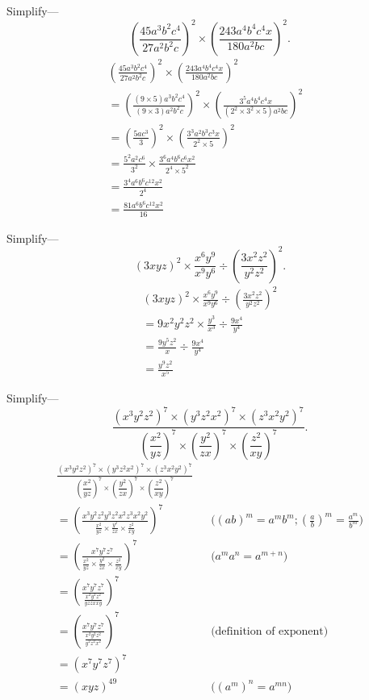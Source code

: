 \documentclass[DIN, pagenumber=false, fontsize=11pt, parskip=half]{scrartcl}
\begin{document}
\begin{problems}[from=1,step=1]
    \problem Simplify---
    \[
        \left(\frac{45 a^3 b^2 c^4}{27 a^2 b^2 c}\right)^{2} \times \left(\frac{243 a^4 b^4 c^4 x}{180 a^2 b c}\right)^{2}.
    \]
    \answer 
    \begin{align*}
        \left(\frac{45a^3b^2c^4}{27a^2b^2c}\right)^2 \times \left(\frac{243a^4b^4c^4x}{180a^2bc}\right)^2 &\\ 
        = \left(\frac{(9\times5)a^3b^2c^4}{(9\times3)a^2b^2c}\right)^2 \times \left(\frac{3^5a^4b^4c^4x}{(2^2\times3^2\times5)a^2bc}\right)^2 \\ 
        = \left(\frac{5ac^3}{3}\right)^2 \times \left(\frac{3^3a^2b^3c^3x}{2^2\times5}\right)^2 \\ 
        = \frac{5^2a^2c^6}{3^2} \times \frac{3^6a^4b^6c^6x^2}{2^4\times5^2} \\ 
        = \frac{3^4a^6b^6c^{12}x^2}{2^4} \\ 
        = \frac{81a^6b^6c^{12}x^2}{16}
    \end{align*}

    \problem Simplify---
    \[
        (3xyz)^2 \times \frac{x^6 y^9}{x^9 y^6} \div \left(\frac{3 x^2 z^2}{y^2 z^2}\right)^{2}.
    \]
    \answer
    \begin{align*}
        (3xyz)^2 \times \frac{x^6y^9}{x^9y^6} \div \left(\frac{3x^2z^2}{y^2z^2}\right)^2 \\ 
        = 9x^2y^2z^2 \times \frac{y^3}{x^3} \div \frac{9x^4}{y^4} \\ 
        = \frac{9y^5z^2}{x} \div \frac{9x^4}{y^4} \\ 
        = \frac{y^9z^2}{x^5}
    \end{align*}

    \problem Simplify---
    \[
        \frac{(x^3 y^2 z^2)^7 \times (y^3 z^2 x^2)^7 \times (z^3 x^2 y^2)^7}{\left(\dfrac{x^2}{yz}\right)^{7} \times \left(\dfrac{y^2}{zx}\right)^{7} \times \left(\dfrac{z^2}{xy}\right)^{7}}.
    \]
    \answer
    \begin{align*}
        \frac{(x^3 y^2 z^2)^7 \times (y^3 z^2 x^2)^7 \times (z^3 x^2 y^2)^7}{\left(\dfrac{x^2}{yz}\right)^{7} \times \left(\dfrac{y^2}{zx}\right)^{7} \times \left(\dfrac{z^2}{xy}\right)^{7}} &\\ 
        = \left(\frac{x^3 y^2 z^2 y^3 z^2 x^2 z^3 x^2 y^2}{\frac{x^2}{yz} \times \frac{y^2}{zx} \times \frac{z^2}{xy}} \right)^7 && \text{($(ab)^m = a^mb^m; (\tfrac{a}{b})^m = \tfrac{a^m}{b^m}$)} \\ 
        = \left(\frac{x^7y^7z^7}{\frac{x^2}{yz} \times \frac{y^2}{zx} \times \frac{z^2}{xy}}\right)^7 && \text{($a^ma^n = a^{m+n}$)}\\ 
        = \left(\frac{x^7y^7z^7}{\frac{x^2y^2z^2}{yzzxxy}}\right)^7 \\ 
        = \left(\frac{x^7y^7z^7}{\frac{x^2y^2z^2}{y^2z^2x^2}}\right)^7 && \text{(definition of exponent)} \\ 
        = \left(x^7y^7z^7\right) ^7 \\ 
        = (xyz)^{49} && \text{($(a^m)^n = a^{mn}$)}
    \end{align*}


\end{problems}
\end{document}
